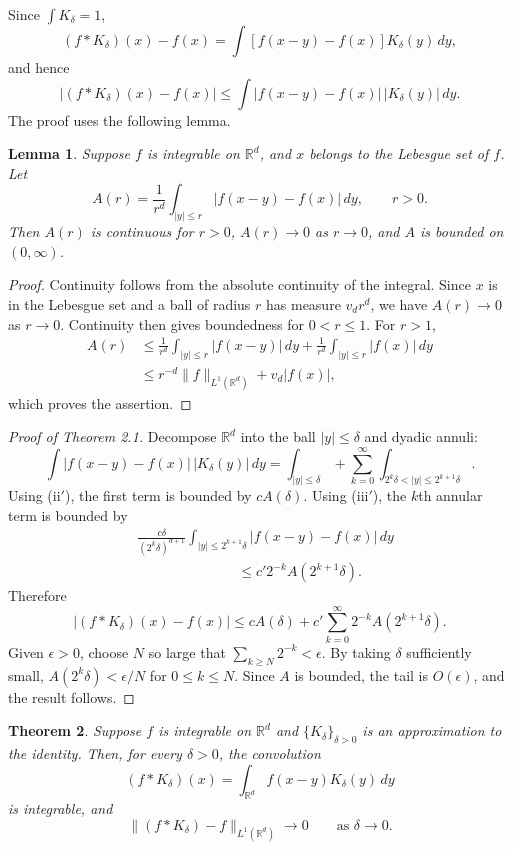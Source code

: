 \documentclass[11pt,openany]{book}
\newtheorem{theorem}{Theorem}[section]
\newtheorem{lemma}[theorem]{Lemma}
\begin{document}
Since $\int K_\delta=1$,
\[
(f*K_\delta)(x)-f(x)
=\int [f(x-y)-f(x)]K_\delta(y)\,dy,
\]
and hence
\[
|(f*K_\delta)(x)-f(x)|
\le\int |f(x-y)-f(x)|\,|K_\delta(y)|\,dy.
\]
The proof uses the following lemma.

\begin{lemma}
Suppose $f$ is integrable on $\mathbb R^d$, and $x$ belongs to the Lebesgue set of $f$. Let
\[
A(r)=\frac1{r^d}\int_{|y|\le r}|f(x-y)-f(x)|\,dy,
\qquad r>0.
\]
Then $A(r)$ is continuous for $r>0$, $A(r)\to0$ as $r\to0$, and $A$ is bounded on $(0,\infty)$.
\end{lemma}

\begin{proof}
Continuity follows from the absolute continuity of the integral. Since $x$ is in the Lebesgue set and a ball of radius $r$ has measure $v_dr^d$, we have $A(r)\to0$ as $r\to0$. Continuity then gives boundedness for $0<r\le1$. For $r>1$,
\begin{align*}
A(r)
&\le \frac1{r^d}\int_{|y|\le r}|f(x-y)|\,dy
 +\frac1{r^d}\int_{|y|\le r}|f(x)|\,dy\\
&\le r^{-d}\|f\|_{L^1(\mathbb R^d)}+v_d|f(x)|,
\end{align*}
which proves the assertion.
\end{proof}

\begin{proof}[Proof of Theorem 2.1]
Decompose $\mathbb R^d$ into the ball $|y|\le\delta$ and dyadic annuli:
\[
\int |f(x-y)-f(x)|\,|K_\delta(y)|\,dy
=
\int_{|y|\le\delta}+\sum_{k=0}^\infty
\int_{2^k\delta<|y|\le2^{k+1}\delta}.
\]
Using (ii$'$), the first term is bounded by $cA(\delta)$. Using (iii$'$), the $k$th annular term is bounded by
\begin{align*}
&\frac{c\delta}{(2^k\delta)^{d+1}}
 \int_{|y|\le2^{k+1}\delta}|f(x-y)-f(x)|\,dy\\
&\hspace{3cm}\le c'2^{-k}A(2^{k+1}\delta).
\end{align*}
Therefore
\[
|(f*K_\delta)(x)-f(x)|
\le cA(\delta)+c'\sum_{k=0}^\infty2^{-k}A(2^{k+1}\delta).
\]
Given $\epsilon>0$, choose $N$ so large that $\sum_{k\ge N}2^{-k}<\epsilon$. By taking $\delta$ sufficiently small, $A(2^k\delta)<\epsilon/N$ for $0\le k\le N$. Since $A$ is bounded, the tail is $O(\epsilon)$, and the result follows.
\end{proof}

\begin{theorem}
Suppose $f$ is integrable on $\mathbb R^d$ and $\{K_\delta\}_{\delta>0}$ is an approximation to the identity. Then, for every $\delta>0$, the convolution
\[
(f*K_\delta)(x)=\int_{\mathbb R^d}f(x-y)K_\delta(y)\,dy
\]
is integrable, and
\[
\|(f*K_\delta)-f\|_{L^1(\mathbb R^d)}\longrightarrow0
\qquad\text{as }\delta\to0.
\]
\end{theorem}
\end{document}
